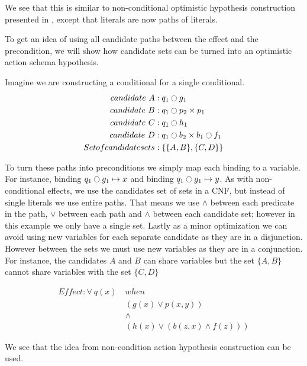 \documentclass[\master/Master.tex]{subfiles}
\begin{document}
  	We see that this is similar to non-conditional optimistic hypothesis construction presented in , except that literals are now paths of literals.
  	
  	\begin{example}\label{ex:ca:opt-hyp-cons} To get an idea of using all candidate paths between the effect and the precondition, 
  		we will show how candidate sets can be turned into an optimistic action schema hypothesis.
  		
  		Imagine we are constructing a conditional for a single conditional.
  		\begin{align*}
  				candidate~ A &: q_1 \ocircle g_1  \\
  				candidate~ B &: q_1 \ocircle p_2 \times p_1  	\\			
  				candidate~ C &: q_1 \ocircle h_1 \\
  				candidate~ D &: q_1 \ocircle b_2 \times b_1 \ocircle  f_1\\
  				Set of candidate sets &: \left\{ \{ A, B \}, \{ C, D \}  \right\}
  		\end{align*}
  		
  		To turn these paths into preconditions we simply map each binding to a variable. 
  		For instance, binding $q_1 \ocircle g_1 \mapsto x$ and binding $q_1 \ocircle g_1 \mapsto y$.   		
  		As with non-conditional effects, we use the candidates set of sets in a CNF, but instead of single literals we use entire paths.
  		That means we use $\land$ between each predicate in the path, $\lor$ between each path and $\land$ between each candidate set; however in this example we only have a single set.	
  		Lastly as a minor optimization we can avoid using new variables for each separate candidate as they are in a disjunction.
  		However between the sets we must use new variables as they are in a conjunction.
  		For instance, the candidates $A$ and $B$ can share variables but the set $\{A, B\}$ cannot share variables with  the set $\{C, D\}$
  		
  			\begin{align*}	
  				Effect: \forall ~q(x)~ & when ~ \\
   				&\left( g(x) \lor p(x,y) \right) \\
  				&\land \\
  				&\left( h(x) \lor \left( b(z,x) \land f(z)  \right) \right)
  			\end{align*}
  		
  		We see that the idea from non-condition action hypothesis construction can be used.
  		
  	\end{example}
  
\end{document}
